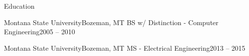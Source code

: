 \section{\faGraduationCap}{Education}

\resumeEntryStart
    \resumeEntryTSDL
        {Montana State University}{Bozeman, MT}
        {BS w/ Distinction - Computer Engineering}{2005 -- 2010}

    \resumeEntryTSDL
        {Montana State University}{Bozeman, MT}
        {MS - Electrical Engineering}{2013 -- 2015}

\resumeEntryEnd
